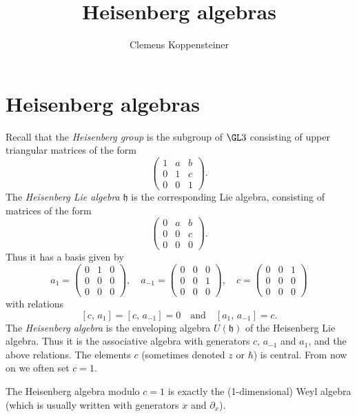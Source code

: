\documentclass{ck-article}
\title{Heisenberg algebras}
\author{Clemens Koppensteiner}
\begin{document}
\maketitle

\section{Heisenberg algebras}

Recall that the \emph{Heisenberg group} is the subgroup of $\GL 3$ consisting of upper triangular matrices of the form
\[
    \begin{pmatrix}
        1 & a & b \\
        0 & 1 & c \\
        0 & 0 & 1
    \end{pmatrix}.
\]
The \emph{Heisenberg Lie algebra} $\mathfrak{h}$ is the corresponding Lie algebra, consisting of matrices of the form
\[
    \begin{pmatrix}
        0 & a & b \\
        0 & 0 & c \\
        0 & 0 & 0
    \end{pmatrix}.
\]
Thus it has a basis given by
\[
    a_1 = 
    \begin{pmatrix}
        0 & 1 & 0 \\
        0 & 0 & 0 \\
        0 & 0 & 0
    \end{pmatrix}, \quad
    a_{-1} = 
    \begin{pmatrix}
        0 & 0 & 0 \\
        0 & 0 & 1 \\
        0 & 0 & 0
    \end{pmatrix}, \quad
    c = 
    \begin{pmatrix}
        0 & 0 & 1 \\
        0 & 0 & 0 \\
        0 & 0 & 0
    \end{pmatrix}
\]
with relations
\[
    [c,\, a_1] = [c,\, a_{-1}] = 0 \quad\text{and}\quad [a_1,\, a_{-1}] = c.
\]
The \emph{Heisenberg algebra} is the enveloping algebra $U(\mathfrak{h})$ of the Heisenberg Lie algebra.
Thus it is the associative algebra with generators $c$, $a_{-1}$ and $a_1$, and the above relations.
The elements $c$ (sometimes denoted $z$ or $\hbar$) is central.
From now on we often set $c = 1$.

\begin{Remark}
    The Heisenberg algebra modulo $c = 1$ is exactly the (1-dimensional) Weyl algebra (which is usually written with generators $x$ and $\partial_x$).
\end{Remark}
\end{document}
